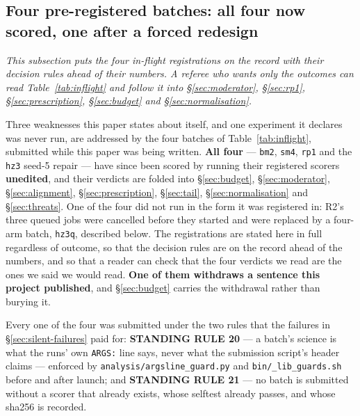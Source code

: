 \documentclass[10pt,letterpaper]{article}
\newcommand{\arm}[1]{\texttt{#1}}
\begin{document}
\subsection{Four pre-registered batches: all four now scored, one after a forced redesign}
\label{sec:inflight}

\emph{This subsection puts the four in-flight registrations on the record with their decision
rules ahead of their numbers. A referee who wants only the outcomes can read
Table~\ref{tab:inflight} and follow it into \S\ref{sec:moderator}, \S\ref{sec:rp1},
\S\ref{sec:prescription}, \S\ref{sec:budget} and \S\ref{sec:normalisation}.}

Three weaknesses this paper states about itself, and one experiment it declares was never run,
are addressed by the four batches of Table~\ref{tab:inflight}, submitted while this paper was
being written. \textbf{All four} --- \arm{bm2}, \arm{sm4}, \arm{rp1} and the \arm{hz3} seed-5
repair --- have since been scored by running their registered scorers \textbf{unedited}, and their
verdicts are folded into \S\ref{sec:budget}, \S\ref{sec:moderator}, \S\ref{sec:alignment},
\S\ref{sec:prescription}, \S\ref{sec:tail}, \S\ref{sec:normalisation} and \S\ref{sec:threats}.
One of the four did not run in the form it was registered in: R2's three queued jobs were
cancelled before they started and were replaced by a four-arm batch, \arm{hz3q}, described below.
The registrations are stated here in full regardless of outcome, so that the decision rules are on
the record ahead of the numbers, and so that a reader can check that the four verdicts we read are
the ones we said we would read. \textbf{One of them withdraws a sentence this project published},
and \S\ref{sec:budget} carries the withdrawal rather than burying it.

Every one of the four was submitted under the two rules that the failures in
\S\ref{sec:silent-failures} paid for: \textbf{STANDING RULE 20} --- a batch's science is what
the runs' own \texttt{ARGS:} line says, never what the submission script's header claims ---
enforced by \texttt{analysis/argsline\_guard.py} and \texttt{bin/\_lib\_guards.sh} before and
after launch; and \textbf{STANDING RULE 21} --- no batch is submitted without a scorer that
already exists, whose selftest already passes, and whose sha256 is recorded.
\end{document}

